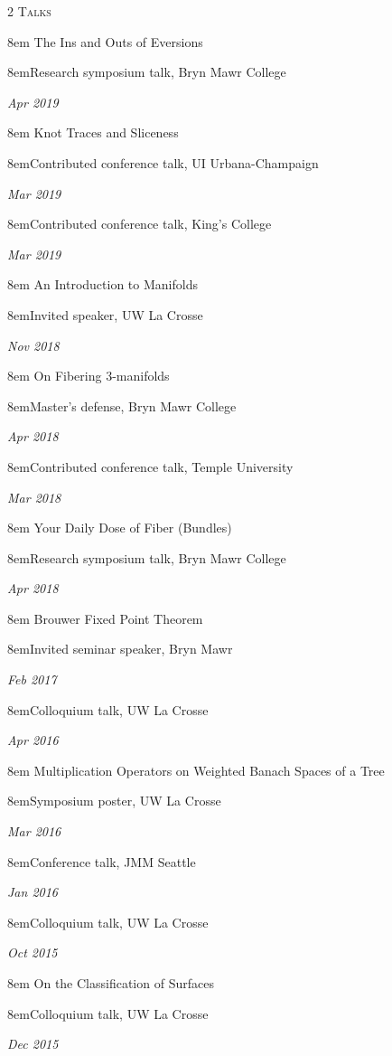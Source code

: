 \documentclass[11pt]{article}
\newcommand{\itemreg}[1]{\begin{addmargin}[0em]{8em} #1 \end{addmargin}}
\newcommand{\iteminddate}[2]{\begin{addmargin}[1.75em]{8em}#1\end{addmargin}\vspace{-1.15em}\hfill\textit{#2}\\}
\begin{document}
\begin{multicols}{2}
	\textsc{Talks}
	
	\columnbreak
	
	\itemreg{The Ins and Outs of Eversions}
		\iteminddate{Research symposium talk, Bryn Mawr College}{Apr 2019}
		\vspace{.35em}
	\itemreg{Knot Traces and Sliceness}
		\iteminddate{Contributed conference talk, UI Urbana-Champaign}{Mar 2019}
		\iteminddate{Contributed conference talk, King's College}{Mar 2019}
		\vspace{.35em}
	\itemreg{An Introduction to Manifolds}
		\iteminddate{Invited speaker, UW La Crosse}{Nov 2018}
		\vspace{.35em}
	\itemreg{On Fibering 3-manifolds}
		\iteminddate{Master's defense, Bryn Mawr College}{Apr 2018}
		\iteminddate{Contributed conference talk, Temple University}{Mar 2018}
		\vspace{.35em}
	\itemreg{Your Daily Dose of Fiber (Bundles)}
		\iteminddate{Research symposium talk, Bryn Mawr College}{Apr 2018}
		\vspace{.35em}
	\itemreg{Brouwer Fixed Point Theorem}
		\iteminddate{Invited seminar speaker, Bryn Mawr}{Feb 2017}
		\iteminddate{Colloquium talk, UW La Crosse}{Apr 2016}
		\vspace{.35em}
	\itemreg{Multiplication Operators on Weighted Banach Spaces of a Tree}
		\iteminddate{Symposium poster, UW La Crosse}{Mar 2016}
		\iteminddate{Conference talk, JMM Seattle}{Jan 2016}
		\iteminddate{Colloquium talk, UW La Crosse}{Oct 2015}
		\vspace{.35em}
	\itemreg{On the Classification of Surfaces}
		\iteminddate{Colloquium talk, UW La Crosse}{Dec 2015}
\end{multicols}
\vspace{-.5em}
\end{document}
